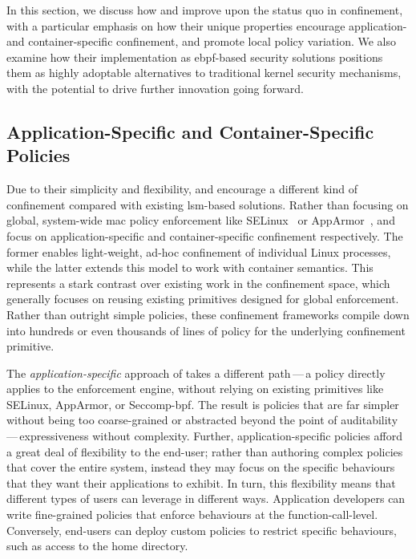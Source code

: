 In this section, we discuss how \bpfbox{} and \bpfcontain{} improve upon the status quo in
confinement, with a particular emphasis on how their unique properties encourage
application- and container-specific confinement, and promote local policy variation. We
also examine how their implementation as \gls{ebpf}-based security solutions positions
them as highly adoptable alternatives to traditional kernel security mechanisms, with the
potential to drive further innovation going forward.

\subsection{Application-Specific and Container-Specific Policies}

Due to their simplicity and flexibility, \bpfbox{} and \bpfcontain{} encourage a different
kind of confinement compared with existing \gls{lsm}-based solutions. Rather than focusing
on global, system-wide \gls{mac} policy enforcement like
SELinux~\cite{smalley2001_selinux} or AppArmor~\cite{cowan2000_apparmor}, \bpfbox{} and
\bpfcontain{} focus on application-specific and container-specific confinement
respectively. The former enables light-weight, ad-hoc confinement of individual Linux
processes, while the latter extends this model to work with container semantics.  This
represents a stark contrast over existing work in the confinement space, which generally
focuses on reusing existing primitives designed for global enforcement.  Rather than
outright simple policies, these confinement frameworks compile down into hundreds or even
thousands of lines of policy for the underlying confinement primitive.

The \textit{application-specific} approach of \bpfbox{} takes a different path\,---\,a
\bpfbox{} policy directly applies to the \bpfbox{} enforcement engine, without relying on
existing primitives like SELinux, AppArmor, or Seccomp-bpf. The result is policies that
are far simpler without being too coarse-grained or abstracted beyond the point of
auditability\,---\,expressiveness without complexity. Further, application-specific
policies afford a great deal of flexibility to the end-user; rather than authoring complex
policies that cover the entire system, instead they may focus on the specific behaviours
that they want their applications to exhibit. In turn, this flexibility means that
different types of users can leverage \bpfbox{} in different ways.  Application developers
can write fine-grained policies that enforce behaviours at the function-call-level.
Conversely, end-users can deploy custom \bpfbox{} policies to restrict specific
behaviours, such as access to the home directory.

